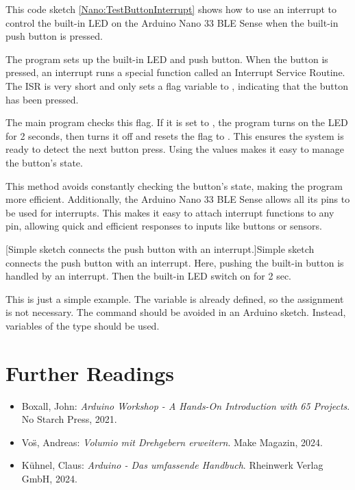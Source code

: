 This code sketch \ref{Nano:TestButtonInterrupt} shows how to use an interrupt to control the built-in LED on the Arduino Nano 33 BLE Sense when the built-in push button is pressed.

The program sets up the built-in LED and push button. When the button is pressed, an interrupt runs a special function called an Interrupt Service Routine. The ISR is very short and only sets a flag variable  to , indicating that the button has been pressed.

The main program  checks this flag. If it is set to , the program turns on the LED for 2 seconds, then turns it off and resets the flag to . This ensures the system is ready to detect the next button press. Using the  values makes it easy to manage the button's state.

This method avoids constantly checking the button’s state, making the program more efficient. Additionally, the Arduino Nano 33 BLE Sense allows all its pins to be used for interrupts. This makes it easy to attach interrupt functions to any pin, allowing quick and efficient responses to inputs like buttons or sensors. \cite{ArduinoInterrupt:2019}



\bigskip







{
    [Simple sketch connects the push button with an interrupt.]{Simple sketch connects the push button with an interrupt. Here, pushing the built-in button is handled by an interrupt. Then the built-in LED switch on for 2 sec.}\label{Nano:TestButtonInterrupt}
}

\bigskip

This is just a simple example. The variable  is already defined, so the assignment is not necessary. The command  should be avoided in an Arduino sketch. Instead, variables of the type  should be used.



\section{Further Readings}

\begin{itemize}
  \item Boxall, John: \textsl{Arduino Workshop - A Hands-On Introduction with 65 Projects}. No Starch Press, 2021. \cite{Boxall:2021}
  \item Vo{\"s}, Andreas: \textsl{Volumio mit Drehgebern erweitern}. Make Magazin, 2024. \cite{Voss:2024}
  \item K\"uhnel, Claus: \textsl{Arduino - Das umfassende Handbuch}. Rheinwerk Verlag GmbH, 2024. \cite{Kuehnel:2024}
\end{itemize}

